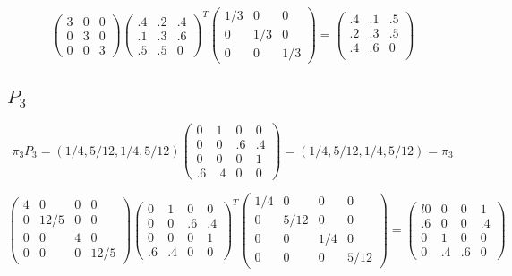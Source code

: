 \documentclass{article}
\begin{document}
\[
\left( \begin{array}{ccc}
	3&0&0\\
	0&3&0\\
    0&0&3
\end{array}\right)
\left( \begin{array}{ccc}
	.4&.2&.4\\
	.1&.3&.6\\
    .5&.5& 0
\end{array}\right)^{T} \left( \begin{array}{ccc}
	1/3	&0&0\\
	0&1/3&0\\
    0&0&1/3
\end{array}\right) = 
\left( \begin{array}{ccc}
	.4&.1&.5\\
	.2&.3&.5\\
    .4&.6&0\\
\end{array}\right)
\]
\subsection*{\underline{$P_3$}}
\[ \pi_3 P_3 =  \left( 1/4, 5/12, 1/4, 5/12 \right) \left( \begin{array}{cccc}
	0&1&0&0\\
	0&0&.6&.4\\
    0&0&0&1\\
    .6&.4&0&0
\end{array}\right)  = \left( 1/4, 5/12, 1/4, 5/12 \right) = \pi_3\]

\[
\left( \begin{array}{cccC}
	4&    0& 0&    0\\
	0& 12/5& 0&    0\\
    0&    0& 4&    0\\
    0&    0& 0& 12/5
\end{array}\right)
\left(\begin{array}{cccc}
	  0&  1&  0&  0\\
      0&  0& .6& .4\\
      0&  0&  0&  1\\
     .6& .4&  0&  0
\end{array}\right) ^{T}
\left( \begin{array}{cccc}
	1/4 & 0    &   0 &    0 \\
	0   & 5/12 &   0 &    0 \\
    0   & 0    & 1/4 &    0 \\
    0   & 0    &   0 & 5/12 
\end{array}\right) = 
\left( \begin{array}{cccc}l
	 0 &  0 &  0 &  1 \\
	.6 &  0 &  0 & .4 \\
     0 &  1 &  0 &  0 \\
     0 & .4 & .6 &  0
\end{array}\right)
\]
\end{document}
